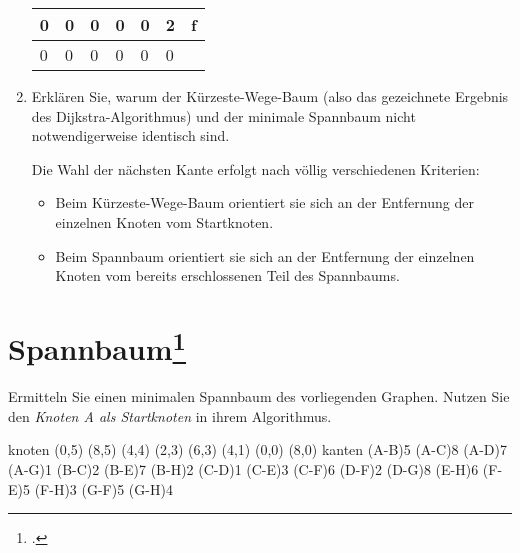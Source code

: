 \documentclass{lehramt-informatik}
\begin{document}
\begin{enumerate}
\begin{antwort}
\begin{tabular}{|l|l|l|l|l|l|l|}
0 & %
0 & %
0 & %
0 & %
0 & %
2 & %
f \\\hline %

0 & %
0 & %
0 & %
0 & %
0 & %
0 & %
\\\hline %
\end{tabular}

\end{antwort}


\item Erklären Sie, warum der Kürzeste-Wege-Baum (also das gezeichnete
Ergebnis des Dijkstra-Algorithmus) und der minimale Spannbaum nicht
notwendigerweise identisch sind.

\begin{antwort}
Die Wahl der nächsten Kante erfolgt nach völlig verschiedenen Kriterien:

\begin{itemize}
\item Beim Kürzeste-Wege-Baum orientiert sie sich an der Entfernung der
einzelnen Knoten vom Startknoten.

\item Beim Spannbaum orientiert sie sich an der Entfernung der einzelnen
Knoten vom bereits erschlossenen Teil des Spannbaums.
\end{itemize}
\end{antwort}
\end{enumerate}

%

\section{Spannbaum\footcite[Aufgabe 6]{aud:e-klausur}}

Ermitteln Sie einen minimalen Spannbaum des vorliegenden Graphen. Nutzen
Sie den \emph{Knoten A als Startknoten} in ihrem Algorithmus.

\graph knoten {
  (0,5)
  (8,5)
  (4,4)
  (2,3)
  (6,3)
  (4,1)
  (0,0)
  (8,0)
} kanten {
  \kante(A-B){5}
  \kante(A-C){8}
  \kante(A-D){7}
  \kante(A-G){1}
  \kante(B-C){2}
  \kante(B-E){7}
  \kante(B-H){2}
  \kante(C-D){1}
  \kante(C-E){3}
  \kante(C-F){6}
  \kante(D-F){2}
  \kante(D-G){8}
  \kante(E-H){6}
  \kante(F-E){5}
  \kante(F-H){3}
  \kante(G-F){5}
  \kante(G-H){4}
}
\end{document}
